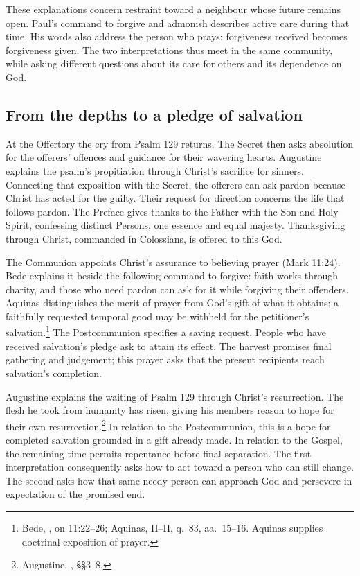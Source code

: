 These explanations concern restraint toward a neighbour whose future
remains open. Paul's command to forgive and admonish describes active
care during that time. His words also address the person who prays:
forgiveness received becomes forgiveness given. The two interpretations
thus meet in the same community, while asking different questions about
its care for others and its dependence on God.

\subsection{From the depths to a pledge of salvation}
At the Offertory the cry from Psalm 129 returns. The Secret then asks
absolution for the offerers' offences and guidance for their wavering
hearts. Augustine explains the psalm's propitiation through Christ's
sacrifice for sinners. Connecting that exposition with the Secret,
the offerers can ask pardon because Christ has acted for the guilty.
Their request for direction concerns the life that follows pardon.
The Preface gives thanks to the Father with the Son and Holy Spirit,
confessing distinct Persons, one essence and equal majesty. Thanksgiving
through Christ, commanded in Colossians, is offered to this God.

The Communion appoints Christ's assurance to believing prayer
(Mark 11:24). Bede explains it beside the following command to forgive:
faith works through charity, and those who need pardon can ask for it
while forgiving their offenders. Aquinas distinguishes the merit of
prayer from God's gift of what it obtains; a faithfully requested temporal
good may be withheld for the petitioner's salvation.\footnote{Bede,
, on 11:22--26; Aquinas, 
II--II, q.~83, aa.~15--16. Aquinas supplies doctrinal exposition of prayer.}
The Postcommunion specifies a saving request. People who have received
salvation's pledge ask to attain its effect. The harvest promises final
gathering and judgement; this prayer asks that the present recipients
reach salvation's completion.

Augustine explains the waiting of Psalm 129 through Christ's resurrection.
The flesh he took from humanity has risen, giving his members reason to
hope for their own resurrection.\footnote{Augustine, , §§3--8.} In relation to the Postcommunion, this is a hope
for completed salvation grounded in a gift already made. In relation to
the Gospel, the remaining time permits repentance before final separation.
The first interpretation consequently asks how to act toward a person
who can still change. The second asks how that same needy person can
approach God and persevere in expectation of the promised end.
